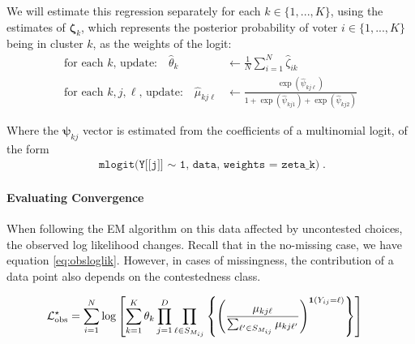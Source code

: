 \documentclass[11pt]{article}
\begin{document}
We will estimate this regression separately for each \(k \in \{1, ..., K\}\), using the estimates of \(\bm{\zeta}_{k}\), which represents the posterior probability of voter \(i \in \{1, ..., K\}\) being in cluster \(k\), as the weights of the logit:
\begin{align}
\text{for each \(k\), update: }~~~  \widehat{\theta}_{k} &\leftarrow \frac{1}{N}\sum^N_{i = 1}\widehat{\zeta}_{ik} \\
\text{for each \(k, j, \ell\), update: }~~~ \widehat{\mu}_{kj\ell} &\leftarrow  \frac{\exp\left(\widehat\psi_{kj\ell}\right)}{1 + \exp\left(\widehat\psi_{kj1}\right) + \exp\left(\widehat\psi_{kj2}\right)}
\end{align}

Where the \(\bm\psi_{kj}\) vector is estimated from the coefficients of a multinomial logit, of the form 
\begin{align*}
\texttt{mlogit(Y[[j]] \(\sim\) 1, data, weights = zeta\_k)}.
\end{align*}

\paragraph{Evaluating Convergence} When following the EM algorithm on this data affected by uncontested choices, the observed log likelihood changes. Recall that in the no-missing case,  we have equation \ref{eq:obsloglik}. However, in cases of missingness, the contribution of a data point also depends on the contestedness class.

\begin{align*}
{\mathcal{L}}^{\star}_{\text{obs}} &= \sum^{N}_{i=1}\log \left[\sum^{K}_{k=1}\theta_k \prod^{D}_{j=1}\prod_{\ell \in S_{M_{ij}}}\left\{\left(\frac{\mu_{kj\ell}}{\sum_{\ell^\prime \in S_{M_{ij}}} \mu_{kj\ell^\prime}}\right)^{\bm{1}\left(Y_{ij} = \ell\right)}\right\}\right]
\end{align*}
\end{document}
